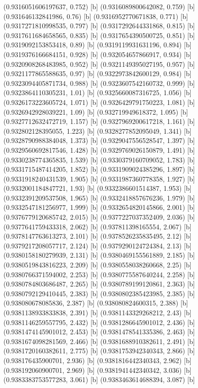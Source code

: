 {{{(0.9316051606197637, 0.752) [b] 
(0.9316089800642082, 0.759) [b] 
(0.931646132841986, 0.76) [b] 
(0.9316952770671838, 0.771) [b] 
(0.9317271810998535, 0.797) [b] 
(0.9317292644331868, 0.815) [b] 
(0.9317611684658565, 0.835) [b] 
(0.9317654390500725, 0.851) [b] 
(0.9319092153853418, 0.89) [b] 
(0.9319119931631196, 0.894) [b] 
(0.9319376166684151, 0.928) [b] 
(0.932054657866917, 0.934) [b] 
(0.9320908268483985, 0.952) [b] 
(0.9321149395027195, 0.957) [b] 
(0.9321177865588635, 0.97) [b] 
(0.9322973842600129, 0.984) [b] 
(0.9323094405871734, 0.988) [b] 
(0.9323607542160732, 0.999) [b] 
(0.9323864110305231, 1.01) [b] 
(0.9325660087316725, 1.056) [b] 
(0.9326173223605724, 1.071) [b] 
(0.9326429791750223, 1.081) [b] 
(0.9326942928039221, 1.09) [b] 
(0.932719949618372, 1.095) [b] 
(0.9327712632472719, 1.157) [b] 
(0.9327969200617218, 1.161) [b] 
(0.932802128395055, 1.223) [b] 
(0.9328277852095049, 1.341) [b] 
(0.9328790988384048, 1.373) [b] 
(0.9329047556528547, 1.397) [b] 
(0.9329560692817546, 1.428) [b] 
(0.9329769026150879, 1.491) [b] 
(0.9330238774365835, 1.539) [b] 
(0.9330379160709052, 1.783) [b] 
(0.9331715487414205, 1.852) [b] 
(0.9331909024385296, 1.897) [b] 
(0.9331918240431539, 1.905) [b] 
(0.9331987360778358, 1.927) [b] 
(0.9332001184847721, 1.93) [b] 
(0.9332386601514387, 1.953) [b] 
(0.9332391209537508, 1.965) [b] 
(0.9332418857676236, 1.979) [b] 
(0.9332547181256977, 1.999) [b] 
(0.9332654820145866, 2.001) [b] 
(0.9376779120685742, 2.015) [b] 
(0.9377227037352409, 2.036) [b] 
(0.9377641759433318, 2.062) [b] 
(0.937811398165554, 2.067) [b] 
(0.9378147763613273, 2.101) [b] 
(0.9378526235835495, 2.12) [b] 
(0.9379217208057717, 2.124) [b] 
(0.9379290124724384, 2.13) [b] 
(0.9380158180279939, 2.131) [b] 
(0.9380469155561889, 2.185) [b] 
(0.9380519843816223, 2.209) [b] 
(0.9380558038260668, 2.25) [b] 
(0.9380766371594002, 2.253) [b] 
(0.9380775587640244, 2.258) [b] 
(0.9380784803686487, 2.265) [b] 
(0.9380789199120861, 2.363) [b] 
(0.9380792129410445, 2.383) [b] 
(0.9380802385423985, 2.385) [b] 
(0.938080678085836, 2.387) [b] 
(0.938080824600315, 2.388) [b] 
(0.9381138933833838, 2.391) [b] 
(0.9381143329268212, 2.43) [b] 
(0.9381146259557795, 2.432) [b] 
(0.9381286645901012, 2.436) [b] 
(0.9381474145901012, 2.453) [b] 
(0.9381478541335386, 2.463) [b] 
(0.9381674098281569, 2.466) [b] 
(0.9381688910382611, 2.491) [b] 
(0.9381720160382611, 2.775) [b] 
(0.9381753942340343, 2.866) [b] 
(0.938176435900701, 2.936) [b] 
(0.9381816442340343, 2.962) [b] 
(0.938192060900701, 2.969) [b] 
(0.9381941442340342, 3.036) [b] 
(0.9383383753577283, 3.061) [b] 
(0.9383463614688394, 3.087) [b] 
}}}
